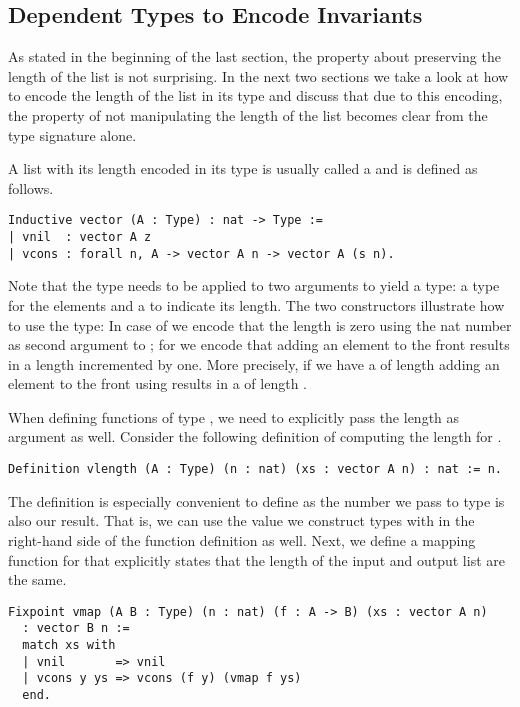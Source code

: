 \subsection{Dependent Types to Encode Invariants}

As stated in the beginning of the last section, the property about  preserving the length of the list is not surprising.
In the next two sections we take a look at how to encode the length of the list in its type and discuss that due to this encoding, the property of  not manipulating the length of the list becomes clear from the type signature alone.

A list with its length encoded in its type is usually called a  and is defined as follows.

\begin{verbatim}
Inductive vector (A : Type) : nat -> Type :=
| vnil  : vector A z
| vcons : forall n, A -> vector A n -> vector A (s n).
\end{verbatim}

Note that the type  needs to be applied to two arguments to yield a type: a type for the elements and a  to indicate its length.
The two constructors illustrate how to use the type: In case of  we encode that the length is zero using the nat number  as second argument to ; for  we encode that adding an element to the front results in a length incremented by one.
More precisely, if we have a  of length  adding an element to the front using  results in a  of length .

When defining functions of type , we need to explicitly pass the length as argument as well.
Consider the following definition of computing the length for .

\begin{verbatim}
Definition vlength (A : Type) (n : nat) (xs : vector A n) : nat := n.
\end{verbatim}

The definition is especially convenient to define as the  number  we pass to type  is also our result.
That is, we can use the value we construct types with in the right-hand side of the function definition as well.
Next, we define a mapping function for  that explicitly states that the length of the input and output list are the same.

\begin{verbatim}
Fixpoint vmap (A B : Type) (n : nat) (f : A -> B) (xs : vector A n)
  : vector B n :=
  match xs with
  | vnil       => vnil
  | vcons y ys => vcons (f y) (vmap f ys)
  end.
\end{verbatim}

